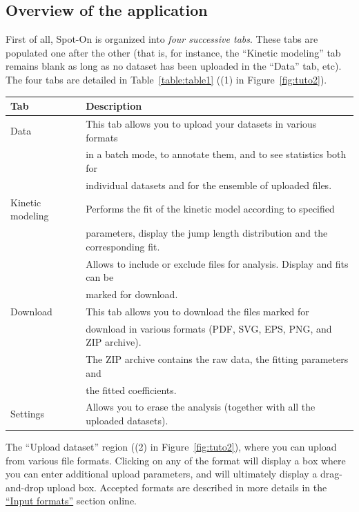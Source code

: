 \subsection{Overview of the application}
First of all, Spot-On is organized into \textit{four successive tabs}. These tabs are populated one after the other (that is, for instance, the ``Kinetic modeling'' tab remains blank as long as no dataset has been uploaded in the ``Data'' tab, etc). The four tabs are detailed in Table~\ref{table:table1} ((1) in Figure~\ref{fig:tuto2}).

\begin{center}
  \label{table:table1}
\begin{tabular}{ll}
Tab & Description\\
\hline
Data & This tab allows you to upload your datasets in various formats
\\&in a batch mode, to annotate them, and to see statistics both for \\&individual datasets and for the ensemble of uploaded files.\\
Kinetic modeling & Performs the fit of the kinetic model according to specified \\&parameters, display the jump length distribution and the corresponding fit. \\&Allows to include or exclude files for analysis. Display and fits can be \\&marked for download.\\
Download & This tab allows you to download the files marked for
\\&download in various formats (PDF, SVG, EPS, PNG, and ZIP archive).
\\&The ZIP archive contains the raw data, the fitting parameters and
\\&the fitted coefficients.\\
Settings & Allows you to erase the analysis (together with all the uploaded datasets).\\
\end{tabular}
\end{center}

The ``Upload dataset'' region ((2) in Figure~\ref{fig:tuto2}), where you can upload from various file formats. Clicking on any of the format will display a box where you can enter additional upload parameters, and will ultimately display a drag-and-drop upload box. Accepted formats are described in more details in the \href{https://spoton.berkeley.edu/SPTGUI/docs/latest#input-formats}{``Input formats''} section online.\\

